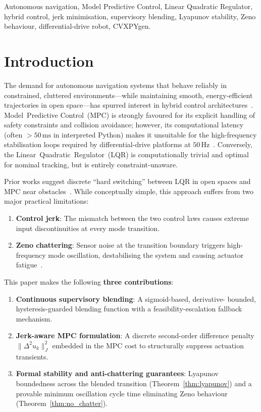 \documentclass[journal]{IEEEtran}
\begin{document}
\begin{IEEEkeywords}
Autonomous navigation, Model Predictive Control, Linear Quadratic Regulator,
hybrid control, jerk minimisation, supervisory blending, Lyapunov stability,
Zeno behaviour, differential-drive robot, CVXPYgen.
\end{IEEEkeywords}

\section{Introduction}\label{sec:intro}

The demand for autonomous navigation systems that behave reliably in constrained,
cluttered environments---while maintaining smooth, energy-efficient trajectories
in open space---has spurred interest in hybrid control architectures~\cite{borrelli2017}.
Model~Predictive Control~(MPC) is strongly favoured for its explicit handling of
safety constraints and collision avoidance; however, its computational latency
(often \(>\!50\,\text{ms}\) in interpreted Python) makes it unsuitable for the
high-frequency stabilisation loops required by differential-drive platforms at
\(50\,\text{Hz}\)~\cite{liberzon2003}.
Conversely, the Linear~Quadratic~Regulator~(LQR) is computationally trivial and
optimal for nominal tracking, but is entirely constraint-unaware.

Prior works suggest discrete ``hard switching'' between LQR in open spaces and
MPC near obstacles~\cite{deluca1998}.
While conceptually simple, this approach suffers from two major practical
limitations:
\begin{enumerate}
  \item \textbf{Control jerk}: The mismatch between the two control laws causes
    extreme input discontinuities at every mode transition.
  \item \textbf{Zeno chattering}: Sensor noise at the transition boundary
    triggers high-frequency mode oscillation, destabilising the system and
    causing actuator fatigue~\cite{hespanha2003}.
\end{enumerate}

This paper makes the following \textbf{three contributions}:
\begin{enumerate}
  \item \textbf{Continuous supervisory blending}: A sigmoid-based, derivative-
    bounded, hysteresis-guarded blending function with a feasibility-escalation
    fallback mechanism.
  \item \textbf{Jerk-aware MPC formulation}: A discrete second-order difference
    penalty \(\|\Delta^2 u_k\|_J^2\) embedded in the MPC cost to structurally
    suppress actuation transients.
  \item \textbf{Formal stability and anti-chattering guarantees}: Lyapunov
    boundedness across the blended transition (Theorem~\ref{thm:lyapunov}) and
    a provable minimum oscillation cycle time eliminating Zeno behaviour
    (Theorem~\ref{thm:no_chatter}).
\end{enumerate}
\end{document}
